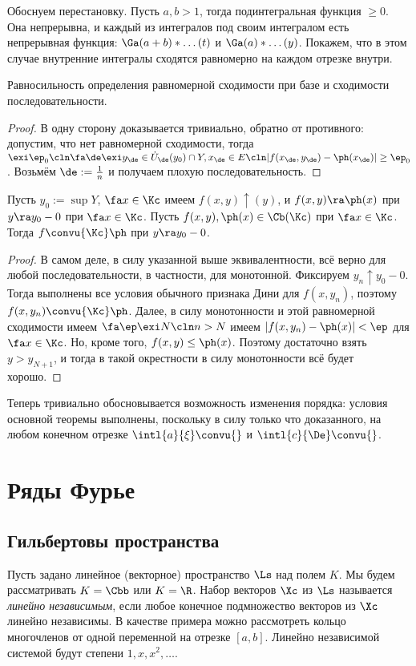 \documentclass[a4paper]{article}
\begin{document}
Обоснуем перестановку. Пусть $a,b>1$, тогда подинтегральная функция $\ge 0$. Она непрерывна, и каждый
из интегралов под своим интегралом есть непрерывная функция: $\Ga(a+b)*\dots(t)$ и $\Ga(a)*\dots(y)$.
Покажем, что в этом случае внутренние интегралы сходятся равномерно на
каждом отрезке внутри.

\begin{theorem}
Равносильность определения равномерной сходимости при базе и сходимости последовательности.
\end{theorem}
\begin{proof}
В одну сторону доказывается тривиально, обратно от противного: допустим, что нет
равномерной сходимости, тогда
$\exi \ep_0\cln\fa \de \exi y_\de\in\dot{U}_\de(y_0)\cap Y, x_\de \in E\cln |f(x_\de,y_\de)-\ph(x_\de)|\ge \ep_0$.
Возьмём $\de := \frac{1}{n}$ и получаем плохую последовательность.
\end{proof}

\begin{theorem}
Пусть $y_0 := \sup Y$, $\fa x \in \Kc$ имеем $f(x,y)\uparrow(y)$, и $f(x,y)\ra\ph(x)$ при $y\ra y_0-0$ при
$\fa x \in \Kc$. Пусть $f(x,y), \ph(x) \in \Cb(\Kc)$ при $\fa x \in \Kc$. Тогда $f\convu{\Kc}\ph$ при $y\ra y_0-0$.
\end{theorem}
\begin{proof}
В самом деле, в силу указанной выше эквивалентности, всё верно для любой
последовательности, в частности, для монотонной. Фиксируем
$y_n\uparrow y_0-0$. Тогда выполнены все условия обычного признака Дини для $f(x,y_n)$,
поэтому $f(x,y_n) \convu{\Kc} \ph$. Далее,
в силу монотонности и этой равномерной сходимости имеем $\fa \ep \exi N\cln n>N$ имеем
$|f(x,y_n)-\ph(x)|<\ep$ для $\fa x \in \Kc$. Но,
кроме того, $f(x,y) \le \ph(x)$. Поэтому достаточно взять $y>y_{N+1}$, и тогда в такой
окрестности в силу монотонности всё будет хорошо.
\end{proof}

Теперь тривиально обосновывается возможность изменения порядка: условия основной теоремы
выполнены, поскольку в силу только что доказанного,
на любом конечном отрезке $\intl{a}{\xi} \convu{}$ и $\intl{c}{\De} \convu{}$.

\section{Ряды Фурье}

\subsection{Гильбертовы пространства}
Пусть задано линейное (векторное) пространство $\Ls$ над полем $K$. Мы будем
рассматривать $K=\Cbb$ или $K = \R$. Набор векторов $\Xc$ из $\Ls$ называется
\emph{линейно независимым}, если любое конечное подмножество
векторов из $\Xc$ линейно независимы. В качестве примера можно рассмотреть кольцо
многочленов от одной переменной на отрезке $[a,b]$.
Линейно независимой системой будут степени $1,x,x^2,\dots$.
\end{document}
